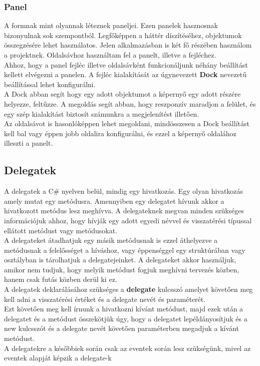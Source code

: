 \documentclass[tocnopagenum]{thesis-ekf}
\theoremstyle{definition}
\theoremstyle{remark}
\begin{document}
	\subsubsection{Panel}
	\label{Panel}
	A formnak mint olyannak léteznek paneljei. Ezen panelek hasznosnak bizonyulnak sok szempontból. Legfőképpen a háttér díszítéséhez, objektumok összegzésére lehet használatos. Jelen alkalmazásban is két fő részében használom a projektnek. 
	Oldalsávhoz használtam fel a panelt, illetve a fejléchez. 
	\\
	Ahhoz, hogy a panel fejléc illetve oldalsávként funkcionáljunk néhány beállítást kellett elvégezni a panelen. A fejléc kialakítását az úgynevezett \textbf{Dock} nevezetű beállítással lehet konfigurálni. 
	 \\
	 A Dock abban segít hogy egy adott objektumot a képernyő egy adott részére helyezze, feltűzze. A megoldás segít abban, hogy reszponzív maradjon a felület, és egy szép kialakítást biztosít számunkra a megjelenítést illetően.
	 \\
	 Az oldalsávot is hasonlóképpen lehet megoldani, mindösszesen a Dock beállítást kell bal vagy éppen jobb oldalira konfigurálni, és ezzel a képernyő oldalához illeszti a panelt.
	\subsection{Delegatek}
	\label{Delegateek}
	A delegatek a C\# nyelven belül, mindig egy hivatkozás. Egy olyan hivatkozás amely mutat egy metódusra. Amennyiben egy delegatet hívunk akkor a hivatkozott metódus lesz meghívva. A delegateknek megvan minden szükséges információjuk ahhoz, hogy hívják egy adott egyedi névvel és visszatérési típussal ellátott metódust vagy metódusokat.
	\\
	A delegateket átadhatjuk egy másik metódusnak is ezzel áthelyezve a metódusnak a felelősséget a híváshoz, vagy éppenséggel egy struktúrában vagy osztályban is tárolhatjuk a delegatejeinket. A delegateket akkor használjuk, amikor nem tudjuk, hogy melyik metódust fogjuk meghívni tervezés közben, hanem csak futás közben derül ki ez.
	\\
	A delegatek deklarálásához szükséges a \textbf{delegate} kulcsszó amelyet követően meg kell adni a visszatérési értéket és a delegate nevét és paraméterét.
	\\ 
	Ezt követően meg kell írnunk a hivatkozni kívánt metódust, majd ezek után a delegatet és a metódust összekötjük úgy, hogy a delegatet lepéldányosítjuk és a new kulcsszót és a delegate nevét követően paraméterben megadjuk a kívánt metódust. 
	\\
	A delegatekre a későbbiek során csak az eventek során lesz szükségünk, mivel az eventek alapját képzik a delegate-k
\end{document}
